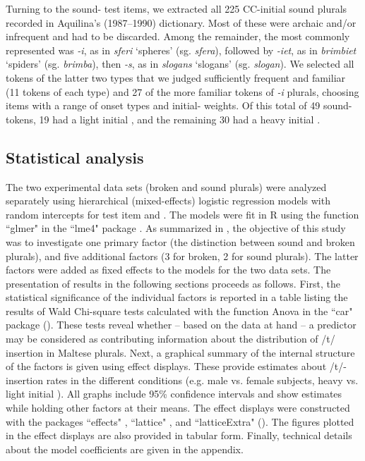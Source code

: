 \documentclass[output=paper]{langsci/langscibook}
\begin{document}
\largerpage
Turning to the sound- test items, we extracted all 225 CC-initial  sound plurals recorded in Aquilina’s (1987–1990) dictionary. Most of these were archaic and/or infrequent and had to be discarded. Among the remainder, the most commonly represented   was \textit{{}-i}, as in \textit{sferi} ‘spheres’ (sg. \textit{sfera}), followed by \textit{{}-iet}, as in \textit{brimbiet} ‘spiders’ (sg. \textit{brimba}), then \textit{{}-s}, as in \textit{slogans} ‘slogans’ (sg. \textit{slogan}). We selected all tokens of the latter two  types that we judged sufficiently frequent and familiar (11 tokens of each type) and 27 of the more familiar tokens of \textit{{}-i} plurals, choosing items with a range of onset types and initial- weights. Of this total of 49 sound- tokens, 19 had a light initial , and the remaining 30 had a heavy initial .

\subsection{Statistical analysis}
The two experimental data sets (broken and sound plurals) were analyzed separately using hierarchical (mixed-effects) logistic regression models with random intercepts for test item and . The models were fit in R \citep{R2016} using the function ``glmer" in the ``lme4" package \citep{BatesEtAl2015}. As summarized in , the objective of this study was to investigate one primary factor (the distinction between sound and broken plurals), and five additional factors (3 for broken, 2 for sound plurals). The latter factors were added as fixed effects to the models for the two data sets. The presentation of results in the following sections proceeds as follows. First, the statistical significance of the individual factors is reported in a table listing the results of Wald Chi-square tests calculated with the function Anova in the ``car" package (\citealt{FoxWeisberg2011}). These tests reveal whether – based on the data at hand – a predictor may be considered as contributing information about the distribution of /t/ insertion in Maltese plurals. Next, a graphical summary of the internal structure of the factors is given using effect displays. These provide estimates about /t/-insertion rates in the different conditions (e.g. male vs. female subjects, heavy vs. light initial ). All graphs include 95\% confidence intervals and show estimates while holding other factors at their means. The effect displays were constructed with the packages ``effects" \citep{Fox2016}, ``lattice" \citep{Sarkar2008}, and ``latticeExtra" (\citealt{SarkarAndrews2016}). The figures plotted in the effect displays are also provided in tabular form. Finally, technical details about the model coefficients are given in the appendix.
\end{document}

